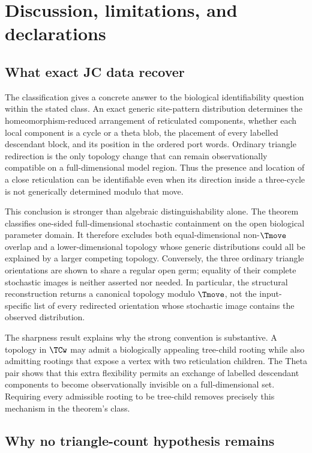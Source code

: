 \section{Discussion, limitations, and declarations}\label{sec:discussion}

\subsection{What exact JC data recover}

The classification gives a concrete answer to the biological identifiability question within the stated class.  An exact generic site-pattern distribution determines the homeomorphism-reduced arrangement of reticulated components, whether each local component is a cycle or a theta blob, the placement of every labelled descendant block, and its position in the ordered port words.  Ordinary triangle redirection is the only topology change that can remain observationally compatible on a full-dimensional model region.  Thus the presence and location of a close reticulation can be identifiable even when its direction inside a three-cycle is not generically determined modulo that move.

This conclusion is stronger than algebraic distinguishability alone.  The theorem classifies one-sided full-dimensional stochastic containment on the open biological parameter domain.  It therefore excludes both equal-dimensional non-$\Tmove$ overlap and a lower-dimensional topology whose generic distributions could all be explained by a larger competing topology.  Conversely, the three ordinary triangle orientations are shown to share a regular open germ; equality of their complete stochastic images is neither asserted nor needed.  In particular, the structural reconstruction returns a canonical topology modulo $\Tmove$, not the input-specific list of every redirected orientation whose stochastic image contains the observed distribution.

The sharpness result explains why the strong convention is substantive.  A topology in $\TCw$ may admit a biologically appealing tree-child rooting while also admitting rootings that expose a vertex with two reticulation children.  The Theta pair shows that this extra flexibility permits an exchange of labelled descendant components to become observationally invisible on a full-dimensional set.  Requiring every admissible rooting to be tree-child removes precisely this mechanism in the theorem's class.

\subsection{Why no triangle-count hypothesis remains}

